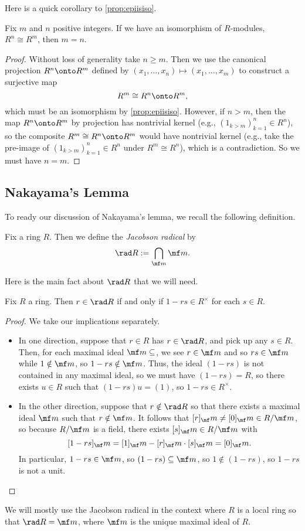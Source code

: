 Here is a quick corollary to \autoref{prop:epiisiso}.
\begin{corollary}
	Fix $m$ and $n$ positive integers. If we have an isomorphism of $R$-modules, $R^n\cong R^m$, then $m=n$.
\end{corollary}
\begin{proof}
	Without loss of generality take $n\ge m$. Then we use the canonical projection $R^n\onto R^m$ defined by $(x_1,\ldots,x_n)\mapsto(x_1,\ldots,x_m)$ to construct a surjective map
	\[R^m\cong R^n\onto R^m,\]
	which must be an isomorphism by \autoref{prop:epiisiso}. However, if $n>m$, then the map $R^n\onto R^m$ by projection has nontrivial kernel (e.g., $(1_{k>m})_{k=1}^n\in R^n$), so the composite $R^m\cong R^n\onto R^m$ would have nontrivial kernel (e.g., take the pre-image of $(1_{k>m})_{k=1}^n\in R^n$ under $R^m\cong R^n$), which is a contradiction. So we must have $n=m$.
\end{proof}

\subsection{Nakayama's Lemma}
To ready our discussion of Nakayama's lemma, we recall the following definition.
\begin{definition}
	Fix a ring $R$. Then we define the \textit{Jacobson radical} by
	\[\rad R:=\bigcap_{\mf m}\mf m.\]
\end{definition}
Here is the main fact about $\rad R$ that we will need.
\begin{lemma} \label{lem:altjacobsonrad}
	Fix $R$ a ring. Then $r\in\rad R$ if and only if $1-rs\in R^\times$ for each $s\in R$.
\end{lemma}
\begin{proof}
	We take our implications separately.
	\begin{itemize}
		\item In one direction, suppose that $r\in R$ has $r\in\rad R$, and pick up any $s\in R$. Then, for each maximal ideal $\mf m\subseteq$, we see $r\in\mf m$ and so $rs\in\mf m$ while $1\notin\mf m$, so $1-rs\notin\mf m$. Thus, the ideal $(1-rs)$ is not contained in any maximal ideal, so we must have $(1-rs)=R$, so there exists $u\in R$ such that $(1-rs)u=(1)$, so $1-rs\in R^\times$.
		\item In the other direction, suppose that $r\notin\rad R$ so that there exists a maximal ideal $\mf m$ such that $r\notin\mf m$. It follows that $[r]_\mf m\ne[0]_\mf m\in R/\mf m$, so because $R/\mf m$ is a field, there exists $[s]_\mf m\in R/\mf m$ with
		\[[1-rs]_\mf m=[1]_\mf m-[r]_\mf m\cdot[s]_\mf m=[0]_\mf m.\]
		In particular, $1-rs\in\mf m$, so $(1-rs)\subseteq\mf m$, so $1\notin(1-rs)$, so $1-rs$ is not a unit.
		\qedhere
	\end{itemize}
\end{proof}
\begin{remark}
	We will mostly use the Jacobson radical in the context where $R$ is a local ring so that $\rad R=\mf m$, where $\mf m$ is the unique maximal ideal of $R$.
\end{remark}

